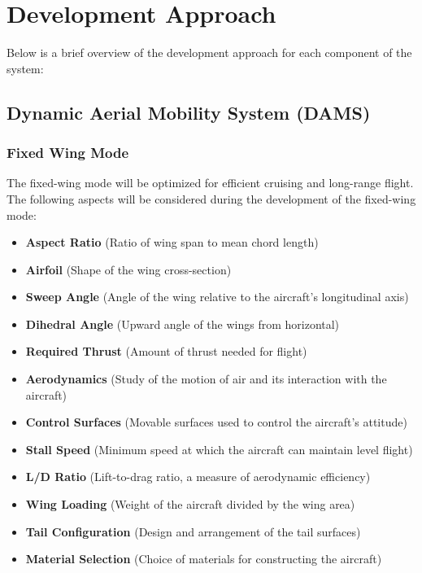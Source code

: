 \documentclass[12pt]{article}
\begin{document}
\newpage

\section{Development Approach}

Below is a brief overview of the development approach for each component of the system:

\subsection{Dynamic Aerial Mobility System (DAMS)}
\subsubsection{Fixed Wing Mode}
The fixed-wing mode will be optimized for efficient cruising and long-range flight.
The following aspects will be considered during the development of the fixed-wing mode:
\begin{itemize}
    \item \textbf{Aspect Ratio} (Ratio of wing span to mean chord length)
    \item \textbf{Airfoil} (Shape of the wing cross-section)
    \item \textbf{Sweep Angle} (Angle of the wing relative to the aircraft's longitudinal axis)
    \item \textbf{Dihedral Angle} (Upward angle of the wings from horizontal)
    \item \textbf{Required Thrust} (Amount of thrust needed for flight)
    \item \textbf{Aerodynamics} (Study of the motion of air and its interaction with the aircraft)
    \item \textbf{Control Surfaces} (Movable surfaces used to control the aircraft's attitude)
    \item \textbf{Stall Speed} (Minimum speed at which the aircraft can maintain level flight)
    \item \textbf{L/D Ratio} (Lift-to-drag ratio, a measure of aerodynamic efficiency)
    \item \textbf{Wing Loading} (Weight of the aircraft divided by the wing area)
    \item \textbf{Tail Configuration} (Design and arrangement of the tail surfaces)
    \item \textbf{Material Selection} (Choice of materials for constructing the aircraft)
\end{itemize}
\end{document}
